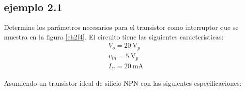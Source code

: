 \documentclass{article}
\begin{document}
\subsection*{ejemplo 2.1}
Determine los parámetros necesarios para el transistor como interruptor que se muestra en la figura \ref{ch2f4}. El circuito tiene las siguientes características:
\begin{align}
	V_o = \qty{20}{\volt}_p \nonumber \\
	v_{in} = \qty{5}{\volt}_p \nonumber \\
	I_C = \qty{20}{\milli \ampere} \nonumber
\end{align}

Asumiendo un transistor ideal de silicio NPN con las siguientes especificaciones:
\end{document}

